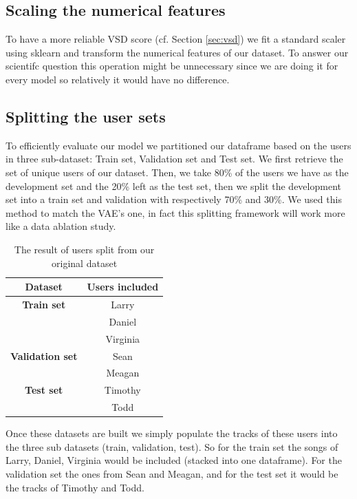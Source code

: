 \subsection{Scaling the numerical features} \label{subsec:nn_scaling}
To have a more reliable VSD score (cf. Section \ref{sec:vsd}) we fit a standard scaler using sklearn and transform the numerical features of our dataset. To answer our scientifc question this operation might be unnecessary since we are doing it for every model so relatively it would have no difference.

\subsection{Splitting the user sets} \label{subsec:split_user_set}
To efficiently evaluate our model we partitioned our dataframe based on the users in three sub-dataset: Train set, Validation set and Test set. We first retrieve the set of unique users of our dataset. Then, we take 80\% of the users we have as the development set and the 20\% left as the test set, then we split the development set into a train set and validation with respectively 70\% and 30\%. We used this method to match the VAE's one, in fact this splitting framework will work more like a data ablation study.

\begin{table}[ht]
    \centering
    \begin{tabular}{c|c}
        \textbf{Dataset} & \textbf{Users included} \\
        \hline
        \textbf{Train set} & Larry \\
        & Daniel \\
        & Virginia \\
        \hline
        \textbf{Validation set} & Sean \\
        & Meagan \\
        \hline
        \textbf{Test set} & Timothy \\
        & Todd \\
    \end{tabular}
    \caption{The result of users split from our original dataset}
    \label{tab:users_df}
\end{table}

Once these datasets are built we simply populate the tracks of these users into the three sub datasets (train, validation, test). So for the train set the songs of Larry, Daniel, Virginia would be included (stacked into one dataframe). For the validation set the ones from Sean and Meagan, and for the test set it would be the tracks of Timothy and Todd.

